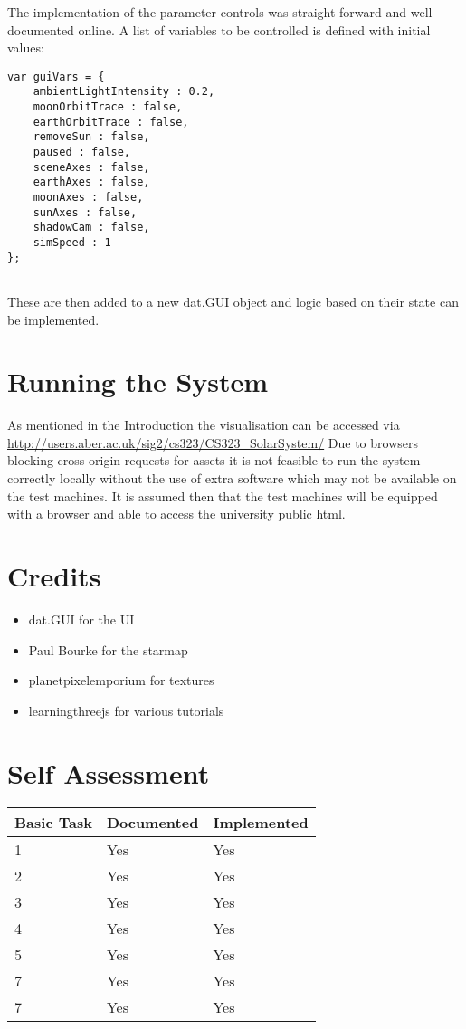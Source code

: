 \documentclass[titlepage]{article}
\begin{document}
The implementation of the parameter controls was straight forward and well documented online. A list of variables to be controlled is defined with initial values:

\begin{lstlisting}[caption=Code taken from main.js]
var guiVars = {
    ambientLightIntensity : 0.2,
    moonOrbitTrace : false,
    earthOrbitTrace : false,
    removeSun : false,
    paused : false,
    sceneAxes : false,
    earthAxes : false,
    moonAxes : false,
    sunAxes : false,
    shadowCam : false,
    simSpeed : 1
};


\end{lstlisting}

These are then added to a new dat.GUI object and logic based on their state can be implemented.
\section{Running the System}
As mentioned in the Introduction the visualisation can be accessed via \url{http://users.aber.ac.uk/sig2/cs323/CS323\_SolarSystem/}
Due to browsers blocking cross origin requests for assets it is not feasible to run the system correctly locally without the use of extra software which may not be available on the test machines. It is assumed then that the test machines will be equipped with a browser and able to access the university public html. 
\section{Credits}

\begin{itemize}
\item dat.GUI for the UI
\item Paul Bourke for the starmap
\item planetpixelemporium for textures
\item learningthreejs for various tutorials
\end{itemize}

\section{Self Assessment}

 \begin{tabularx}{0.5\columnwidth}{| X | X | X |}
            \hline
            Basic Task & Documented & Implemented \\
            \hline
            1 & Yes & Yes \\
            \hline
            2 & Yes & Yes\\
            \hline
            3 & Yes & Yes \\
            \hline
            4 & Yes & Yes \\
            \hline
            5 & Yes & Yes \\
            \hline
            7 & Yes & Yes \\
            \hline
            7 & Yes & Yes \\
            \hline
        \end{tabularx} \\
\end{document}
